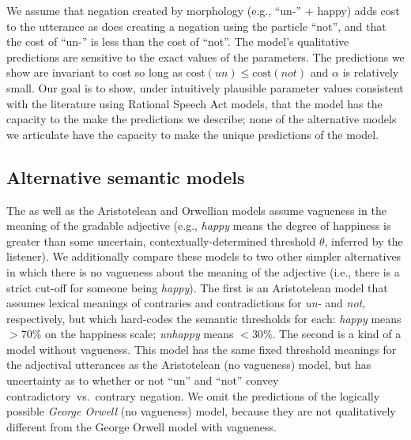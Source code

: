 \documentclass[floatsintext,doc]{apa6}
\begin{document}
We assume that negation created by morphology (e.g., ``un-'' + happy) adds cost to the utterance as does creating a negation using the particle ``not'', and that the cost of ``un-'' is less than the cost of ``not''.
The \ourmodel model's qualitative predictions are sensitive to the exact values of the parameters. The predictions we show are invariant to cost so long as $\text{cost}(un) \leq \text{cost}(not)$ and $\alpha$ is relatively small. Our goal is to show, under intuitively plausible parameter values consistent with the literature using Rational Speech Act models, that the \ourmodel model has the capacity to the make the predictions we describe; none of the alternative models we articulate have the capacity to make the unique predictions of the \ourmodel model.










\subsection{Alternative semantic models}

The \ourmodel as well as the Aristotelean and Orwellian models assume vagueness in the meaning of the gradable adjective (e.g., \emph{happy} means the degree of happiness is greater than some uncertain, contextually-determined threshold $\theta$, inferred by the listener).
We additionally compare these models to two other simpler alternatives in which there is no vagueness about the meaning of the adjective (i.e., there is a strict cut-off for someone being \emph{happy}). 
The first is an Aristotelean model that assumes lexical meanings of contraries and contradictions for \emph{un-} and \emph{not}, respectively, but which hard-codes the semantic thresholds for each:  \emph{happy} means \(>70\%\) on the happiness scale; \emph{unhappy} means \(<30\%\).
The second is a kind of a \ourmodel model without vagueness. 
This model has the same fixed threshold meanings for the adjectival utterances as the Aristotelean (no vagueness) model, but has uncertainty as to whether or not ``un'' and ``not'' convey contradictory~vs.~contrary negation. 
We omit the predictions of the logically possible \emph{George Orwell} (no vagueness) model, because they are not qualitatively different from the George Orwell model with vagueness.
\end{document}
